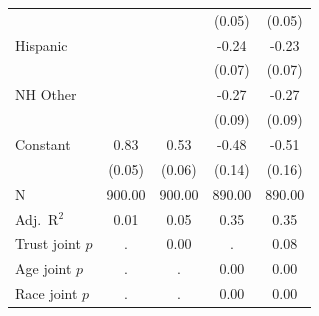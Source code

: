 {\begin{tabular*}{\linewidth}{@{\hskip\tabcolsep\extracolsep\fill}l*{4}{c}}
                    &                     &                     &      (0.05)         &      (0.05)         \\
Hispanic            &                     &                     &       -0.24\sym{***}&       -0.23\sym{***}\\
                    &                     &                     &      (0.07)         &      (0.07)         \\
NH Other            &                     &                     &       -0.27\sym{***}&       -0.27\sym{***}\\
                    &                     &                     &      (0.09)         &      (0.09)         \\
Constant            &        0.83\sym{***}&        0.53\sym{***}&       -0.48\sym{***}&       -0.51\sym{***}\\
                    &      (0.05)         &      (0.06)         &      (0.14)         &      (0.16)         \\
\midrule
N                   &      900.00         &      900.00         &      890.00         &      890.00         \\
Adj.\ R$^2$         &        0.01         &        0.05         &        0.35         &        0.35         \\
Trust joint $p$     &           .         &        0.00         &           .         &        0.08         \\
Age joint $p$       &           .         &           .         &        0.00         &        0.00         \\
Race joint $p$      &           .         &           .         &        0.00         &        0.00         \\
\bottomrule
\end{tabular*}
}
